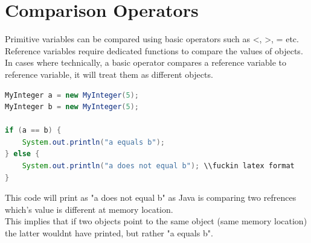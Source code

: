 \documentclass[11pt]{article}
\newcommand{\topic}[1]{\section*{#1}}
\begin{document}
\topic{Comparison Operators}
Primitive variables can be compared using basic operators such as \textless , \textgreater , = etc.
Reference variables require dedicated functions to compare the values of objects. \\In cases where technically, a basic operator compares a reference variable to reference variable, it will treat them as different objects.
\begin{lstlisting}[language=Java] 
MyInteger a = new MyInteger(5);
MyInteger b = new MyInteger(5);

if (a == b) {
    System.out.println("a equals b");
} else {
    System.out.println("a does not equal b"); \\fuckin latex format
}
\end{lstlisting}
This code will print as "a does not equal b" as Java is comparing two refrences which's value is different at memory location. \\
This implies that if two objects point to the same object (same memory location) the latter wouldnt have printed, but rather "a equals b".
\end{document}
